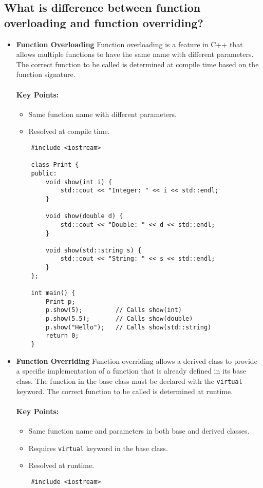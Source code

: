 \subsection{What is difference between function overloading and function overriding?}
\begin{itemize} 
    \item \textbf{Function Overloading} Function overloading is a feature in C++ that allows multiple functions to have the same name with different parameters. The correct function to be called is determined at compile time based on the function signature.
    \paragraph{Key Points:}
    \begin{itemize}
        \item Same function name with different parameters.
        \item Resolved at compile time.
    \end{itemize}
    \begin{tcolorbox}[title=Function Overloading]
    \begin{verbatim}
    #include <iostream>

    class Print {
    public:
        void show(int i) {
            std::cout << "Integer: " << i << std::endl;
        }

        void show(double d) {
            std::cout << "Double: " << d << std::endl;
        }

        void show(std::string s) {
            std::cout << "String: " << s << std::endl;
        }
    };

    int main() {
        Print p;
        p.show(5);         // Calls show(int)
        p.show(5.5);       // Calls show(double)
        p.show("Hello");   // Calls show(std::string)
        return 0;
    }
    \end{verbatim}
    \end{tcolorbox}
    \item \textbf{Function Overriding} Function overriding allows a derived class to provide a specific implementation of a function that is already defined in its base class. The function in the base class must be declared with the \texttt{virtual} keyword. The correct function to be called is determined at runtime.
    \paragraph{Key Points:}
    \begin{itemize}
        \item Same function name and parameters in both base and derived classes.
        \item Requires \texttt{virtual} keyword in the base class.
        \item Resolved at runtime.
    \end{itemize}
    \begin{tcolorbox}[title=Function Overriding]
    \begin{verbatim}
    #include <iostream>


\end{verbatim}
\end{tcolorbox}
\end{itemize}
